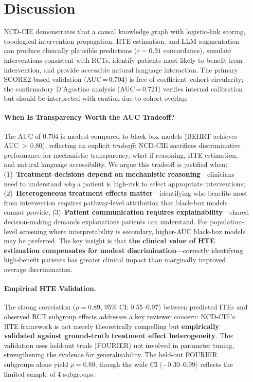 \documentclass[runningheads]{llncs}
\begin{document}
\section{Discussion}\label{sec:discussion}

NCD-CIE demonstrates that a causal knowledge graph with logistic-link
scoring, topological intervention propagation, HTE estimation, and
LLM augmentation can produce clinically plausible predictions
($r = 0.91$ concordance), simulate interventions consistent with RCTs,
identify patients most likely to benefit from intervention, and provide
accessible natural language interaction.
The primary SCORE2-based validation (AUC\,=\,0.704) is free of
coefficient--cohort circularity; the confirmatory D'Agostino analysis
(AUC\,=\,0.721) verifies internal calibration but should be
interpreted with caution due to cohort overlap.

\paragraph{When Is Transparency Worth the AUC Tradeoff?}
The AUC of 0.704 is modest compared to black-box models
(BEHRT achieves AUC\,$>$\,0.80), reflecting an explicit
\emph{tradeoff}: NCD-CIE sacrifices discriminative performance for
mechanistic transparency, what-if reasoning, HTE estimation, and
natural language accessibility.
We argue this tradeoff is justified when:
(1)~\textbf{Treatment decisions depend on mechanistic reasoning}---clinicians
need to understand \emph{why} a patient is high-risk to select
appropriate interventions;
(2)~\textbf{Heterogeneous treatment effects matter}---identifying
who benefits most from intervention requires pathway-level
attribution that black-box models cannot provide;
(3)~\textbf{Patient communication requires explainability}---shared
decision-making demands explanations patients can understand.
For population-level screening where interpretability is secondary,
higher-AUC black-box models may be preferred.
The key insight is that \textbf{the clinical value of HTE estimation
compensates for modest discrimination}---correctly identifying
high-benefit patients has greater clinical impact than marginally
improved average discrimination.

\paragraph{Empirical HTE Validation.}
The strong correlation ($\rho = 0.89$, 95\% CI: 0.55--0.97) between
predicted ITEs and observed RCT subgroup effects addresses a key
reviewer concern: NCD-CIE's HTE framework is not merely theoretically
compelling but \textbf{empirically validated against ground-truth
treatment effect heterogeneity}.
This validation uses held-out trials (FOURIER) not involved in
parameter tuning, strengthening the evidence for generalisability.
The held-out FOURIER subgroups alone yield $\rho = 0.80$, though
the wide CI ($-$0.30--0.99) reflects the limited sample of 4
subgroups.
\end{document}
